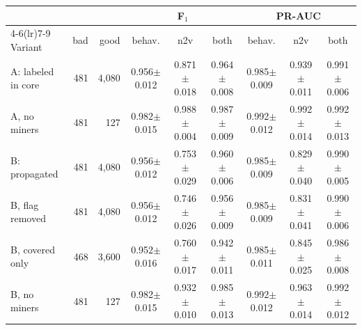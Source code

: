\begin{tabular}{l r r ccc ccc}
\toprule
 & & & \multicolumn{3}{c}{F$_1$} & \multicolumn{3}{c}{PR-AUC}\\
\cmidrule(lr){4-6}\cmidrule(lr){7-9}
Variant & bad & good & behav. & n2v & both & behav. & n2v & both\\
\midrule
A: labeled in core & 481 & 4,080 & 0.956{\scriptsize$\pm$0.012} & 0.871{\scriptsize$\pm$0.018} & 0.964{\scriptsize$\pm$0.008} & 0.985{\scriptsize$\pm$0.009} & 0.939{\scriptsize$\pm$0.011} & 0.991{\scriptsize$\pm$0.006}\\
A, no miners & 481 & 127 & 0.982{\scriptsize$\pm$0.015} & 0.988{\scriptsize$\pm$0.004} & 0.987{\scriptsize$\pm$0.009} & 0.992{\scriptsize$\pm$0.012} & 0.992{\scriptsize$\pm$0.014} & 0.992{\scriptsize$\pm$0.013}\\
B: propagated & 481 & 4,080 & 0.956{\scriptsize$\pm$0.012} & 0.753{\scriptsize$\pm$0.029} & 0.960{\scriptsize$\pm$0.006} & 0.985{\scriptsize$\pm$0.009} & 0.829{\scriptsize$\pm$0.040} & 0.990{\scriptsize$\pm$0.005}\\
B, flag removed & 481 & 4,080 & 0.956{\scriptsize$\pm$0.012} & 0.746{\scriptsize$\pm$0.026} & 0.956{\scriptsize$\pm$0.009} & 0.985{\scriptsize$\pm$0.009} & 0.831{\scriptsize$\pm$0.041} & 0.990{\scriptsize$\pm$0.006}\\
B, covered only & 468 & 3,600 & 0.952{\scriptsize$\pm$0.016} & 0.760{\scriptsize$\pm$0.017} & 0.942{\scriptsize$\pm$0.011} & 0.985{\scriptsize$\pm$0.011} & 0.845{\scriptsize$\pm$0.025} & 0.986{\scriptsize$\pm$0.008}\\
B, no miners & 481 & 127 & 0.982{\scriptsize$\pm$0.015} & 0.932{\scriptsize$\pm$0.010} & 0.985{\scriptsize$\pm$0.013} & 0.992{\scriptsize$\pm$0.012} & 0.963{\scriptsize$\pm$0.014} & 0.992{\scriptsize$\pm$0.012}\\
\bottomrule
\end{tabular}